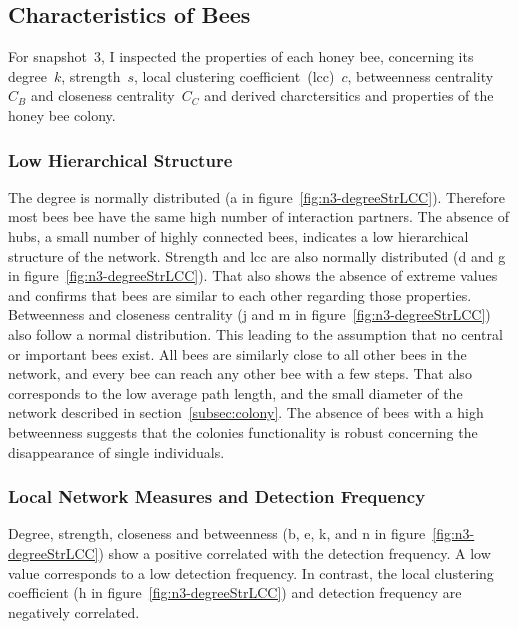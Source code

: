 \subsection{Characteristics of Bees}
\label{subsubsec:bees}
For snapshot~3, I inspected the properties of each honey bee, concerning its degree~$k$, strength~$s$, local clustering coefficient~(lcc)~$c$, betweenness centrality~$C_B$ and closeness centrality~$C_C$ and derived charctersitics and properties of the honey bee colony.

\subsubsection{Low Hierarchical Structure}
The degree is normally distributed (a in figure~\ref{fig:n3-degreeStrLCC}).
Therefore most bees bee have the same high number of interaction partners.
The absence of hubs, a small number of highly connected bees, indicates a low hierarchical structure of the network.
Strength and lcc are also normally distributed (d and g in figure~\ref{fig:n3-degreeStrLCC}).
That also shows the absence of extreme values and confirms that bees are similar to each other regarding those properties.
Betweenness and closeness centrality (j and m in figure~\ref{fig:n3-degreeStrLCC}) also follow a normal distribution.
This leading to the assumption that no central or important bees exist.
All bees are similarly close to all other bees in the network, and every bee can reach any other bee with a few steps.
That also corresponds to the low average path length, and the small diameter of the network described in section~\ref{subsec:colony}.
The absence of bees with a high betweenness suggests that the colonies functionality is robust concerning the disappearance of single individuals.

\subsubsection{Local Network Measures and Detection Frequency}
Degree, strength, closeness and betweenness (b, e, k, and n in figure~\ref{fig:n3-degreeStrLCC}) show a positive correlated with the detection frequency. A low value corresponds to a low detection frequency. In contrast, the local clustering coefficient (h in figure~\ref{fig:n3-degreeStrLCC}) and detection frequency are negatively correlated.

